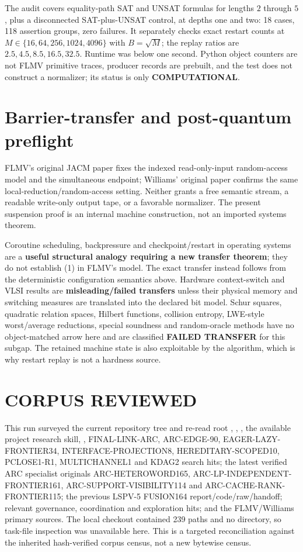 \documentclass[11pt]{article}
\begin{document}
The audit covers equality-path SAT and UNSAT formulas for lengths $2$ through
$5$, plus a disconnected SAT-plus-UNSAT control, at depths one and two: 18
cases, 118 assertion groups, zero failures.  It separately checks exact restart
counts at $M\in\{16,64,256,1024,4096\}$ with $B=\sqrt M$; the replay ratios are
$2.5,4.5,8.5,16.5,32.5$.  Runtime was below one second.  Python object counters
are not FLMV primitive traces, producer records are prebuilt, and the test does
not construct a normalizer; its status is only \textbf{COMPUTATIONAL}.

\section{Barrier-transfer and post-quantum preflight}
FLMV's original JACM paper fixes the indexed read-only-input random-access
model and the simultaneous endpoint; Williams' original paper confirms the
same local-reduction/random-access setting.  Neither grants a free semantic
stream, a readable write-only output tape, or a favorable normalizer.  The
present suspension proof is an internal machine construction, not an imported
systems theorem.

Coroutine scheduling, backpressure and checkpoint/restart in operating systems
are a \textbf{useful structural analogy requiring a new transfer theorem}; they
do not establish (1) in FLMV's model.  The exact transfer instead follows from
the deterministic configuration semantics above.  Hardware context-switch and
VLSI results are \textbf{misleading/failed transfers} unless their physical
memory and switching measures are translated into the declared bit model.
Schur squares, quadratic relation spaces, Hilbert functions, collision entropy,
LWE-style worst/average reductions, special soundness and random-oracle methods
have no object-matched arrow here and are classified \textbf{FAILED TRANSFER}
for this subgap.  The retained machine state is also exploitable by the
algorithm, which is why restart replay is not a hardness source.

\section{CORPUS REVIEWED}
This run surveyed the current repository tree and re-read root
, , , the available project
research skill, , FINAL-LINK-ARC, ARC-EDGE-90,
EAGER-LAZY-FRONTIER34, INTERFACE-PROJECTION8, HEREDITARY-SCOPED10,
PCLOSE1-R1, MULTICHANNEL1 and KDAG2 search hits; the latest verified ARC
specialist originals ARC-HETEROWORD165, ARC-LP-INDEPENDENT-FRONTIER161,
ARC-SUPPORT-VISIBILITY114 and ARC-CACHE-RANK-FRONTIER115; the previous
LSPV-5 FUSION164 report/code/raw/handoff; relevant governance, coordination
and exploration hits; and the FLMV/Williams primary sources.  The local
checkout contained 239 paths and no  directory, so task-file
inspection was unavailable here.  This is a targeted reconciliation against
the inherited hash-verified corpus census, not a new bytewise census.
\end{document}
